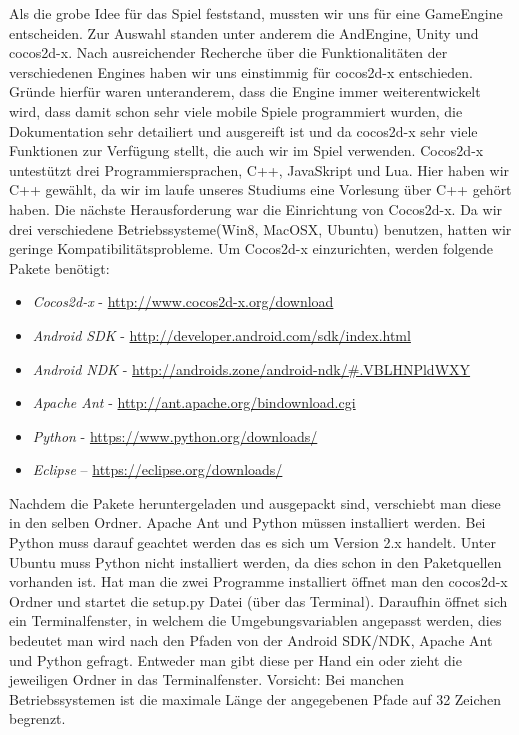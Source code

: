 \label{sec:2_Framework}
Als die grobe Idee für das Spiel feststand, mussten wir uns für eine GameEngine entscheiden. Zur Auswahl standen unter anderem die AndEngine, Unity und cocos2d-x. Nach ausreichender Recherche über die Funktionalitäten der verschiedenen Engines haben wir uns einstimmig für cocos2d-x entschieden. Gründe hierfür waren unteranderem, dass die Engine immer weiterentwickelt wird, dass damit schon sehr viele mobile Spiele programmiert wurden, die Dokumentation sehr detailiert und ausgereift ist und da cocos2d-x sehr viele Funktionen zur Verfügung stellt, die auch wir im Spiel verwenden. Cocos2d-x untestützt drei Programmiersprachen, C++, JavaSkript und Lua. Hier haben wir C++ gewählt, da wir im laufe unseres Studiums eine Vorlesung über C++ gehört haben.
Die nächste Herausforderung war die Einrichtung von Cocos2d-x. Da wir drei verschiedene Betriebssysteme(Win8, MacOSX, Ubuntu) benutzen, hatten wir geringe Kompatibilitätsprobleme.
Um Cocos2d-x einzurichten, werden folgende Pakete benötigt:

\begin{itemize}
\item \textit{Cocos2d-x} - \url{http://www.cocos2d-x.org/download}
\item \textit{Android SDK} - \url{http://developer.android.com/sdk/index.html}
\item \textit{Android NDK} - \url{http://androids.zone/android-ndk/#.VBLHNPldWXY}
\item \textit{Apache Ant} - \url{http://ant.apache.org/bindownload.cgi}
\item \textit{Python} - \url{https://www.python.org/downloads/}
\item \textit{Eclipse} – \url{https://eclipse.org/downloads/}
\end{itemize}

Nachdem die Pakete heruntergeladen und ausgepackt sind, verschiebt man diese in den selben Ordner. Apache Ant und Python müssen installiert werden. Bei Python muss darauf geachtet werden das es sich um Version 2.x handelt. Unter Ubuntu muss Python nicht installiert werden, da dies schon in den Paketquellen vorhanden ist. 
Hat man die zwei Programme installiert öffnet man den cocos2d-x Ordner und startet die setup.py Datei (über das Terminal). Daraufhin öffnet sich ein Terminalfenster, in welchem die Umgebungsvariablen angepasst werden, dies bedeutet man wird nach den Pfaden von der Android SDK/NDK, Apache Ant und Python gefragt. Entweder man gibt diese per Hand ein oder zieht die jeweiligen Ordner in das Terminalfenster. Vorsicht: Bei manchen Betriebssystemen ist die maximale Länge der angegebenen Pfade auf 32 Zeichen begrenzt.


